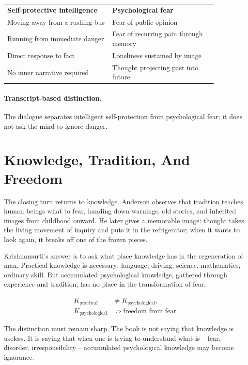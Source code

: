 \documentclass[11pt,oneside]{book}
\begin{document}
\begin{table}
\centering
\begin{tabular}{p{0.43\linewidth}p{0.43\linewidth}}
\textbf{Self-protective intelligence} & \textbf{Psychological fear}\\
Moving away from a rushing bus & Fear of public opinion\\
Running from immediate danger & Fear of recurring pain through memory\\
Direct response to fact & Loneliness sustained by image\\
No inner narrative required & Thought projecting past into future\\
\end{tabular}

\paragraph{Transcript-based distinction.}
The dialogue separates intelligent self-protection from psychological fear; it does not ask the mind to ignore danger.
\end{table}

\section{Knowledge, Tradition, And Freedom}

The closing turn returns to knowledge. Anderson observes that tradition teaches human beings what to fear, handing down warnings, old stories, and inherited images from childhood onward. He later gives a memorable image: thought takes the living movement of inquiry and puts it in the refrigerator; when it wants to look again, it breaks off one of the frozen pieces.

Krishnamurti's answer is to ask what place knowledge has in the regeneration of man. Practical knowledge is necessary: language, driving, science, mathematics, ordinary skill. But accumulated psychological knowledge, gathered through experience and tradition, has no place in the transformation of fear.

\begin{align}
K_{\mathrm{practical}} &\neq K_{\mathrm{psychological}},\\
K_{\mathrm{psychological}} &\not\Rightarrow \text{freedom from fear}.
\end{align}

The distinction must remain sharp. The book is not saying that knowledge is useless. It is saying that when one is trying to understand what is -- fear, disorder, irresponsibility -- accumulated psychological knowledge may become ignorance.
\end{document}
